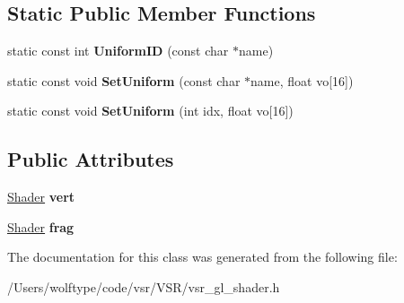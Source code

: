 \subsection*{Static Public Member Functions}
\begin{DoxyCompactItemize}
\item 
\hypertarget{classvsr_1_1_shader_program_ad5672608cc56446e2becc797f43cad96}{static const int {\bfseries Uniform\-I\-D} (const char $\ast$name)}\label{classvsr_1_1_shader_program_ad5672608cc56446e2becc797f43cad96}

\item 
\hypertarget{classvsr_1_1_shader_program_a21267b3b9a3fc2073a5fb5993dc1e4b2}{static const void {\bfseries Set\-Uniform} (const char $\ast$name, float vo\mbox{[}16\mbox{]})}\label{classvsr_1_1_shader_program_a21267b3b9a3fc2073a5fb5993dc1e4b2}

\item 
\hypertarget{classvsr_1_1_shader_program_a1b8af8697b50bbee31d7144e95e253bc}{static const void {\bfseries Set\-Uniform} (int idx, float vo\mbox{[}16\mbox{]})}\label{classvsr_1_1_shader_program_a1b8af8697b50bbee31d7144e95e253bc}

\end{DoxyCompactItemize}
\subsection*{Public Attributes}
\begin{DoxyCompactItemize}
\item 
\hypertarget{classvsr_1_1_shader_program_a77eaa2458cbd4d1b0271d8c046a33f5e}{\hyperlink{classvsr_1_1_shader}{Shader} {\bfseries vert}}\label{classvsr_1_1_shader_program_a77eaa2458cbd4d1b0271d8c046a33f5e}

\item 
\hypertarget{classvsr_1_1_shader_program_a2c5fbb5b835b3201095d6a696877d759}{\hyperlink{classvsr_1_1_shader}{Shader} {\bfseries frag}}\label{classvsr_1_1_shader_program_a2c5fbb5b835b3201095d6a696877d759}

\end{DoxyCompactItemize}


The documentation for this class was generated from the following file\-:\begin{DoxyCompactItemize}
\item 
/\-Users/wolftype/code/vsr/\-V\-S\-R/vsr\-\_\-gl\-\_\-shader.\-h\end{DoxyCompactItemize}

